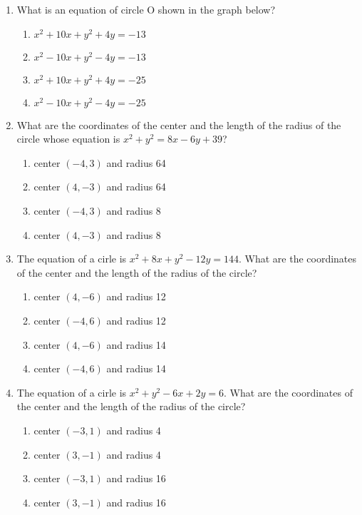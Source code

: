 \documentclass[12pt, twoside]{article}
\begin{document}
\begin{enumerate}
  \item %
  What is an equation of circle O shown in the graph below?
  \begin{center}
  \end{center}
  \begin{multicols}{2}
    \begin{enumerate}
      \item $x^2+10x+y^2+4y=-13$
      \item $x^2-10x+y^2-4y=-13$
      \item $x^2+10x+y^2+4y=-25$
      \item $x^2-10x+y^2-4y=-25$
    \end{enumerate}
  \end{multicols}

  


  \item %
  What are the coordinates of the center and the length of the radius of the circle whose equation is $x^2+y^2=8x-6y+39$?
    \begin{enumerate}
      \item center $(-4,3)$ and radius 64
      \item center $(4,-3)$ and radius 64
      \item center $(-4,3)$ and radius 8
      \item center $(4,-3)$ and radius 8
    \end{enumerate}

\item %
The equation of a cirle is $x^2+8x+y^2-12y=144$. What are the coordinates of the center and the length of the radius of the circle?
  \begin{enumerate}
    \item center $(4,-6)$ and radius 12
    \item center $(-4,6)$ and radius 12
    \item center $(4,-6)$ and radius 14
    \item center $(-4,6)$ and radius 14
  \end{enumerate}

\item %
The equation of a cirle is $x^2+y^2-6x+2y=6$. What are the coordinates of the center and the length of the radius of the circle?
  \begin{enumerate}
    \item center $(-3,1)$ and radius 4
    \item center $(3,-1)$ and radius 4
    \item center $(-3,1)$ and radius 16
    \item center $(3,-1)$ and radius 16
  \end{enumerate}


\end{enumerate}
\end{document}
